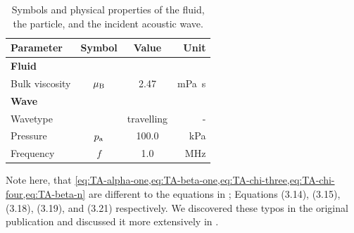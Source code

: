 \begin{table}
  \centering
  \begin{tabular}{lccr}
    \toprule
    \toprule
    {\bfseries Parameter} & {\bfseries Symbol} & {\bfseries Value} & {\bfseries 
    Unit}\\
    \midrule
    \textbf{Fluid} & & \\
    Bulk viscosity & $\mu_{\mathrm{B}}$ & 2.47 & \si{\milli\pascal\second} \\
    \midrule
    \textbf{Wave} & & \\
    Wavetype &  & travelling & - \\
    Pressure & $p_{\mathrm{a}}$ & 100.0 & \si{\kilo\pascal} \\
    Frequency & $f$ & 1.0 & \si{\MHz} \\
    \bottomrule
    \bottomrule
  \end{tabular}
  \caption{Symbols and physical properties of the fluid, the particle, and the 
  incident acoustic wave.}\label{tab:TA-parameters}
\end{table}

Note here, that 
\cref{eq:TA-alpha-one,eq:TA-beta-one,eq:TA-chi-three,eq:TA-chi-four,eq:TA-beta-n} 
are different to the equations in ; Equations (3.14), 
(3.15), (3.18), (3.19), and (3.21) respectively. We discovered these typos in 
the original publication and discussed it more extensively in 
.

